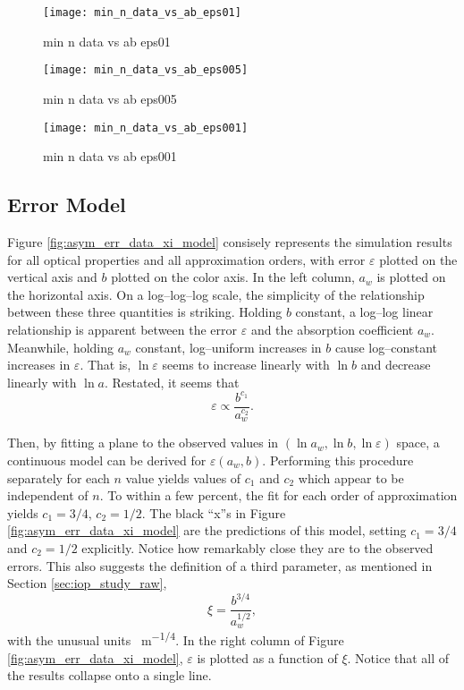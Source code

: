 \begin{figure}[H]
  \centering
  \texttt{[image: min\_n\_data\_vs\_ab\_eps01]}
  \caption{min n data vs ab eps01}
  \label{fig:min_n_data_vs_ab_eps01}
\end{figure}

\begin{figure}[H]
  \centering
  \texttt{[image: min\_n\_data\_vs\_ab\_eps005]}
  \caption{min n data vs ab eps005}
  \label{fig:min_n_data_vs_ab_eps005}
\end{figure}

\begin{figure}[H]
  \centering
  \texttt{[image: min\_n\_data\_vs\_ab\_eps001]}
  \caption{min n data vs ab eps001}
  \label{fig:min_n_data_vs_ab_eps001}
\end{figure}

\subsection{Error Model}
Figure \ref{fig:asym_err_data_xi_model} consisely represents the simulation results for all optical properties and all approximation orders, with error $\varepsilon$ plotted on the vertical axis and $b$ plotted on the color axis.
In the left column, $a_w$ is plotted on the horizontal axis.
On a log--log--log scale, the simplicity of the relationship between these three quantities is striking.
Holding $b$ constant, a log--log linear relationship is apparent between the error $\varepsilon$ and the absorption coefficient $a_w$.
Meanwhile, holding $a_w$ constant, log--uniform increases in $b$ cause log--constant increases in $\varepsilon$.
That is, $\ln\varepsilon$ seems to increase linearly with $\ln b$ and decrease linearly with $\ln a$.
Restated, it seems that
\begin{equation}
  \varepsilon \propto \frac{b^{c_1}}{a_w^{c_2}}.
\end{equation}

Then, by fitting a plane to the observed values in $(\ln a_w, \ln b, \ln \varepsilon)$ space, a continuous model can be derived for $\varepsilon(a_w, b)$.
Performing this procedure separately for each $n$ value yields values of $c_1$ and $c_2$ which appear to be independent of $n$.
To within a few percent, the fit for each order of approximation yields $c_1=3/4$, $c_2=1/2$.
The black ``x''s in Figure \ref{fig:asym_err_data_xi_model} are the predictions of this model, setting $c_1=3/4$ and $c_2=1/2$ explicitly.
Notice how remarkably close they are to the observed errors.
This also suggests the definition of a third parameter, as mentioned in Section \ref{sec:iop_study_raw},
\begin{equation}
  \xi = \frac{b^{3/4}}{a_w^{1/2}},
\end{equation}
with the unusual units \SI{}{\m^{-1/4}}.
In the right column of Figure \ref{fig:asym_err_data_xi_model}, $\varepsilon$ is plotted as a function of $\xi$.
Notice that all of the results collapse onto a single line.



